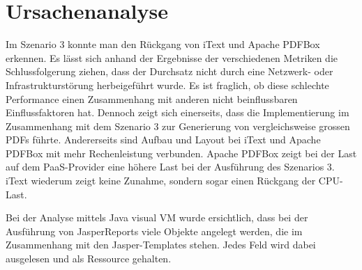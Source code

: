 \documentclass[main.tex]{subfiles}
\begin{document}
\section{Ursachenanalyse}

Im Szenario 3 konnte man den Rückgang von iText und Apache PDFBox erkennen. Es lässt sich anhand der Ergebnisse der verschiedenen Metriken die Schlussfolgerung ziehen, dass der Durchsatz nicht durch eine Netzwerk- oder Infrastrukturstörung herbeigeführt wurde. Es ist fraglich, ob diese schlechte Performance einen Zusammenhang mit anderen nicht beinflussbaren Einflussfaktoren hat. Dennoch zeigt sich einerseits, dass die Implementierung im Zusammenhang mit dem Szenario 3 zur Generierung von vergleichsweise grossen PDFs führte. Andererseits sind Aufbau und Layout bei iText und Apache PDFBox mit mehr Rechenleistung verbunden. Apache PDFBox zeigt bei der Last auf dem PaaS-Provider eine höhere Last bei der Ausführung des Szenarios 3. iText wiederum zeigt keine Zunahme, sondern sogar einen Rückgang der CPU-Last.

Bei der Analyse mittels Java visual VM wurde ersichtlich, dass bei der Ausführung von JasperReports viele Objekte angelegt werden, die im Zusammenhang mit den Jasper-Templates stehen. Jedes Feld wird dabei ausgelesen und als Ressource gehalten.
\end{document}

